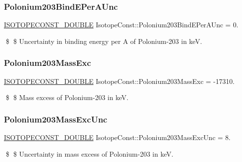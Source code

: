 \subsubsection{\texorpdfstring{Polonium203\+Bind\+E\+Per\+A\+Unc}{Polonium203BindEPerAUnc}}
{\footnotesize\ttfamily \mbox{\hyperlink{group___isotope_const-_macros_ga8f45a7272ce02c0b4c65c44636ed719a}{I\+S\+O\+T\+O\+P\+E\+C\+O\+N\+S\+T\+\_\+\+D\+O\+U\+B\+LE}} Isotope\+Const\+::\+Polonium203\+Bind\+E\+Per\+A\+Unc = 0.}

\$ \$ Uncertainty in binding energy per A of Polonium-\/203 in keV. \mbox{\label{group___isotope_const-_polonium-_po203_gadf9dc3a7632f7ef079c24e460efe82cf}} 
\subsubsection{\texorpdfstring{Polonium203\+Mass\+Exc}{Polonium203MassExc}}
{\footnotesize\ttfamily \mbox{\hyperlink{group___isotope_const-_macros_ga8f45a7272ce02c0b4c65c44636ed719a}{I\+S\+O\+T\+O\+P\+E\+C\+O\+N\+S\+T\+\_\+\+D\+O\+U\+B\+LE}} Isotope\+Const\+::\+Polonium203\+Mass\+Exc = -\/17310.}

\$ \$ Mass excess of Polonium-\/203 in keV. \mbox{\label{group___isotope_const-_polonium-_po203_ga34462c3d05c244825da925abff928da6}} 
\subsubsection{\texorpdfstring{Polonium203\+Mass\+Exc\+Unc}{Polonium203MassExcUnc}}
{\footnotesize\ttfamily \mbox{\hyperlink{group___isotope_const-_macros_ga8f45a7272ce02c0b4c65c44636ed719a}{I\+S\+O\+T\+O\+P\+E\+C\+O\+N\+S\+T\+\_\+\+D\+O\+U\+B\+LE}} Isotope\+Const\+::\+Polonium203\+Mass\+Exc\+Unc = 8.}

\$ \$ Uncertainty in mass excess of Polonium-\/203 in keV. \mbox{\label{group___isotope_const-_polonium-_po203_gad34dfe27de2839b8dc656c7039330911}} 
